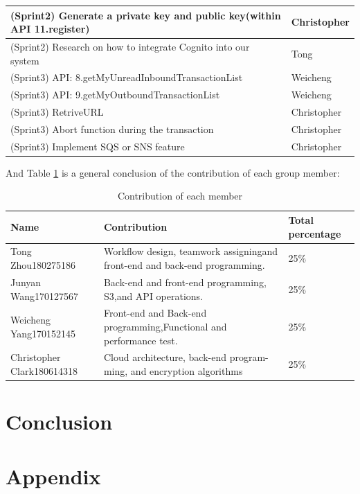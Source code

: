 \documentclass[runningheads]{llncs}
\begin{document}
\begin{table}[H]
\begin{threeparttable}
\begin{tabular} {p{7cm}|p{2.5cm}<{\centering}}
        	\hline
        	(Sprint2) Generate a private key and public key(within API 11.register) & Christopher\\
        	\hline
        	(Sprint2) Research on how to integrate Cognito into our system & Tong\\
        	\hline
        	(Sprint3) API: 8.getMyUnreadInboundTransactionList & Weicheng\\
        	\hline
        	(Sprint3) API: 9.getMyOutboundTransactionList & Weicheng\\
        	\hline
        	(Sprint3) RetriveURL & Christopher\\
        	\hline
        	(Sprint3) Abort function during the transaction & Christopher\\
        	\hline
        	(Sprint3) Implement SQS or SNS feature & Christopher\\
        	\hline
 
      		\bottomrule
    		\end{tabular}
    	\end{threeparttable}   
	\end{table}


And Table \ref{table:Contribution} is a general conclusion of the contribution of each group member:
	\begin{table}[H] %
    	\centering
    	\caption{Contribution of each member}
    	\label{table:Contribution} 
    	\begin{threeparttable}
    		\begin{tabular} {p{2.5cm}|p{7cm}|p{2.5cm}<{\centering}}
    		\toprule
      		Name & Contribution & Total percentage \\
      		\midrule
        	Tong Zhou180275186 & Workflow   design,   teamwork   assigningand front-end and back-end programming. & 25\% \\
        	\hline
        	Junyan Wang170127567 & Back-end and front-end programming, S3,and API operations. & 25\% \\
        	\hline
        	Weicheng Yang170152145 & Front-end   and   Back-end   programming,Functional and performance test. & 25\% \\
        	\hline
        	Christopher Clark180614318 & Cloud   architecture,   back-end   program-ming, and encryption algorithms & 25\% \\
 
      		\bottomrule
    		\end{tabular}
    	\end{threeparttable}   
	\end{table}


\section{Conclusion}

\newpage



\newpage
\section{Appendix}
\end{document}
